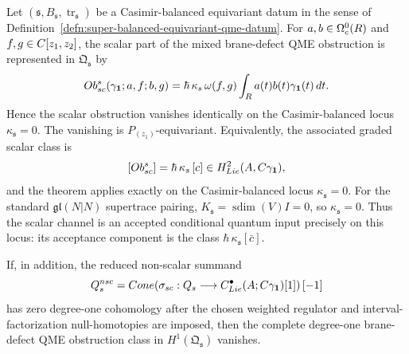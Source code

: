 \begin{thm}\label{thm:joint-super-balanced-symp-qme-vanishing}
  Let
  \((\mathfrak s,B_{\mathfrak s},\operatorname{tr}_{\mathfrak s})\)
  be a Casimir-balanced equivariant datum in the sense of
  Definition~\ref{defn:super-balanced-equivariant-qme-datum}.  For
  \(a,b\in\Omega^0_c(R)\) and
  \(f,g\in C[z_1,z_2]\), the scalar part of the mixed brane-defect QME
  obstruction is represented in \(\mathfrak Q_{\mathfrak s}\) by
  \[
    Ob^{s}_{sc}
    (\gamma_{\mathbf 1};a,f;b,g)
    =
    \hbar\,\kappa_{s}\,
    \omega(f,g)
    \int_{R}a(t)b(t)\gamma_{\mathbf 1}(t)\,dt .
  \]
  Hence the scalar obstruction vanishes identically on the
  Casimir-balanced locus \(\kappa_{\mathfrak s}=0\).  The vanishing is
  \(P_{(z_1)}\)-equivariant.
  Equivalently, the associated graded scalar class is
  \[
    [Ob^{s}_{sc}]
    =
    \hbar\,\kappa_{s}\,
    [c]
    \in
    H^2_{Lie}(A,C\gamma_{\mathbf 1}),
  \]
  and the theorem applies exactly on the Casimir-balanced locus
  \(\kappa_{\mathfrak s}=0\).  For the standard
  \(\mathfrak{gl}(N|N)\) supertrace pairing,
  \(K_{\mathfrak s}=\operatorname{sdim}(V)I=0\), so
  \(\kappa_{\mathfrak s}=0\).
  Thus the scalar channel is an accepted conditional quantum input
  precisely on this locus: its acceptance component is the class
  \(\hbar\,\kappa_{\mathfrak s}[\bar c]\).

  If, in addition, the reduced non-scalar summand
  \[
    Q_{s}^{nsc}
      =
      Cone\!\left(
      \sigma_{sc}:
      Q_{s}
      \longrightarrow
      C^\bullet_{Lie}(A;C\gamma_{\mathbf 1})[1]
      \right)[-1]
  \]
  has zero degree-one cohomology after the chosen weighted regulator and
  interval-factorization null-homotopies are imposed, then the complete
  degree-one brane-defect QME obstruction class in
  \(H^1(\mathfrak Q_{\mathfrak s})\) vanishes.
\end{thm}

